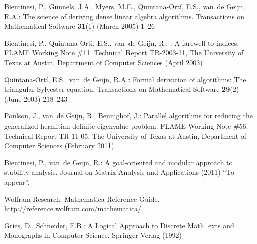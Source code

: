 \documentclass{llncs}
\begin{document}
\begin{thebibliography}{10}
Bientinesi, P., Gunnels, J.A., Myers, M.E., Quintana-Ort\'{i}, E.S., {v}an~de
  Geijn, R.A.:
\newblock The science of deriving dense linear algebra algorithms.
 Transactions on Mathematical Software \textbf{31}(1) (March
  2005)  1--26

Bientinesi, P., Quintana-Ort\'{\i}, E.S., van~de Geijn, R.:
: A farewell to indices. {FLAME} {W}orking {N}ote \#11.
\newblock Technical Report TR-2003-11, The University of Texas at Austin,
  Department of Computer Sciences (April 2003)

Quintana-Ort\'{i}, E.S., {v}an~de Geijn, R.A.:
\newblock Formal derivation of algorithms: The triangular {Sylvester} equation.
 Transactions on Mathematical Software \textbf{29}(2) (June
  2003)  218--243

Poulson, J., van~de Geijn, R., Bennighof, J.:
\newblock Parallel algorithms for reducing the generalized hermitian-definite
  eigenvalue problem. {FLAME} {W}orking {N}ote \#56.
\newblock Technical Report TR-11-05, The University of Texas at Austin,
  Department of Computer Sciences (February 2011)

Bientinesi, P., van~de Geijn, R.:
\newblock A goal-oriented and modular approach to stability analysis.
 Journal on Matrix Analysis and Applications (2011) ``To
  appear''.

{Wolfram {R}esearch}:
\newblock Mathematica {R}eference {G}uide.
\newblock \\\url{http://reference.wolfram.com/mathematica/}

Gries, D., Schneider, F.B.:
\newblock A Logical Approach to Discrete Math.
exts and {M}onographs in {C}omputer {S}cience. Springer Verlag
  (1992)

\end{thebibliography}
\end{document}
